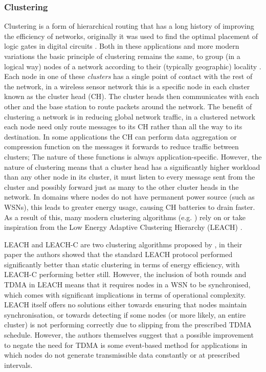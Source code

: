 \subsubsection*{Clustering}
Clustering is a form of hierarchical routing that has a long history of improving the efficiency of networks, originally it was used to find the optimal placement of logic gates in digital circuits \cite{clustering}. Both in these applications and more modern variations the basic principle of clustering remains the same, to group (in a logical way) nodes of a network according to their (typically geographic) locality \cite{1628365}. Each node in one of these \emph{clusters} has a single point of contact with the rest of the network, in a wireless sensor network this is a specific node in each cluster known as the cluster head (CH). The cluster heads then communicates with each other and the base station to route packets around the network. The benefit of clustering a network is in reducing global network traffic, in a clustered network each node need only route messages to its CH rather than all the way to its destination. In some applications the CH can perform data aggregation or compression function\cite{1285913, aggregation} on the messages it forwards to reduce traffic between clusters; The nature of these functions is always application-specific. However, the nature of clustering means that a cluster head has a significantly higher workload than any other node in its cluster, it must listen to every message sent from the cluster and possibly forward just as many to the other cluster heads in the network. In domains where nodes do not have permanent power source (such as WSNs), this leads to greater energy usage, causing CH batteries to drain faster\cite{placement}. As a result of this, many modern clustering algorithms (e.g. \cite{eemc, secc}) rely on or take inspiration from the Low Energy Adaptive Clustering Hierarchy (LEACH) \cite{LEACH}.

LEACH and LEACH-C are two clustering algorithms proposed by \citeauthor{LEACH}, in their paper the authors showed that the standard LEACH protocol performed significantly better than static clustering in terms of energy efficiency, with LEACH-C performing better still. However, the inclusion of both rounds and TDMA in LEACH means that it requires nodes in a WSN to be synchronised, which comes with significant implications in terms of operational complexity. LEACH itself offers no solutions either towards ensuring that nodes maintain synchronisation, or towards detecting if some nodes (or more likely, an entire cluster) is not performing correctly due to slipping from the prescribed TDMA schedule. However, the authors themselves suggest that a possible improvement to negate the need for TDMA is some event-based method for applications in which nodes do not generate transmissible data constantly or at prescribed intervals.

